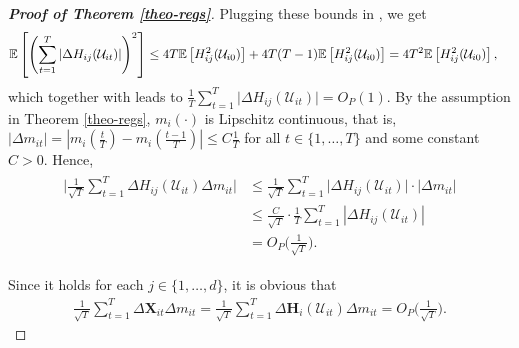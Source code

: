 \documentclass[a4paper,12pt]{article}
\makeatletter
\renewcommand{\eqref}[1]{\tagform@{\ref{#1}}}
\makeatother
\begin{document}
\begin{proof}[\textnormal{\textbf{Proof of Theorem \ref{theo-regs}}}]
Plugging these bounds in \eqref{theo-regs-proof-4}, we get
\begin{align*}
\mathbb{E} &\left[ \left(\sum_{t=1}^T \left|\Delta  H_{ij} (\mathcal{U}_{it})\right|\right)^2 \right] \leq 4T \mathbb{E} \left[ H^2_{ij} (\mathcal{U}_{i0}) \right] + 4T(T-1)\mathbb{E} \left[ H^2_{ij} (\mathcal{U}_{i0}) \right] = 4 T^2 \mathbb{E} \left[ H^2_{ij} (\mathcal{U}_{i0}) \right],
\end{align*}
which together with \eqref{theo-regs-proof-3} leads to $\frac{1}{T}\sum_{t=1}^T \big|\Delta H_{ij}(\mathcal{U}_{it})\big| = O_P(1)$. By the assumption in Theorem \ref{theo-regs}, $m_i(\cdot)$ is Lipschitz continuous, that is,  $|\Delta m_{it}| = \left|m_i \left( \frac{t}{T} \right) - m_i \left(\frac{t-1}{T}\right) \right| \leq C \frac{1}{T}$ for all $t \in \{1, \ldots, T\}$ and some constant $C > 0$. Hence, 
\begin{align}\label{theo-regs-proof-2}
\begin{split}
\Big| \frac{1}{\sqrt{T}}\sum_{t=1}^T \Delta  H_{ij} (\mathcal{U}_{it})\Delta m_{it}\Big| &\leq \frac{1}{\sqrt{T}}\sum_{t=1}^T \big|\Delta  H_{ij} (\mathcal{U}_{it})\big| \cdot \big| \Delta m_{it} \big| \\
	& \leq \frac{C}{\sqrt{T}} \cdot \frac{1}{T} \sum_{t=1}^T \left|\Delta  H_{ij} (\mathcal{U}_{it})\right|\\
& = O_P\Big(\frac{1}{\sqrt{T}}\Big).
\end{split}
\end{align}

Since it holds for each $j\in\{1, \ldots, d\}$, it is obvious that
\begin{align}\label{theo-regs-proof-6}
\frac{1}{\sqrt{T}}\sum_{t=1}^T \Delta \mathbf{X}_{it} \Delta m_{it}  =\frac{1}{\sqrt{T}}\sum_{t=1}^T \Delta  \mathbf{H}_i (\mathcal{U}_{it})\Delta m_{it}= O_P\Big(\frac{1}{\sqrt{T}}\Big).
\end{align}


\end{proof}
\end{document}
